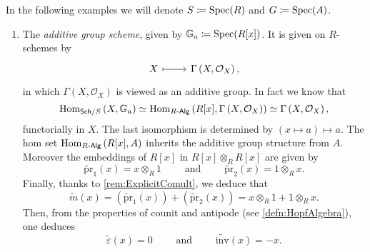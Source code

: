 \begin{ex}\label{ex:AffineGroupSchemesExamples}
	In the following examples we will denote $S \coloneqq \operatorname{Spec}(R)$
	and $G \coloneqq \operatorname{Spec}(A)$.\nopagebreak[4]
	\begin{enumerate}
		\item \label{ex:AdditiveGroupScheme}
		The \emph{additive group scheme}, given by 
			$\mathbb{G}_a \coloneqq \operatorname{Spec}(R[x])$.
			It is given on $R$-schemes by
			\begin{equation*}
			\begin{tikzcd}[row sep = 0ex
				,/tikz/column 1/.append style={anchor=base east}
				,/tikz/column 2/.append style={anchor=base west}]
				X \arrow[r, "", mapsto] & 
				\Gamma \left( X , \mathcal{O}_{ X } \right)
			,\end{tikzcd}
			\end{equation*} 
			in which $\Gamma \left( X , \mathcal{O}_{ X } \right)$ is viewed
			as an additive group.
			In fact	we know that
			\begin{equation*}
			\operatorname{Hom}_{\mathsf{Sch}/S} \left( X, \mathbb{G}_a \right) \simeq
			\operatorname{Hom}_{R \text{-}\mathsf{Alg}} 
			\left( R[x], \Gamma \left( X , \mathcal{O}_{ X } \right) \right) \simeq
			\Gamma \left( X , \mathcal{O}_{ X } \right)
			,\end{equation*} 
			functorially in $X$.
			The last isomorphism is determined by 
			$(x \mapsto a) \mapsto a$.
			The hom set 
			$\operatorname{Hom}_{R \text{-}\mathsf{Alg}} \left( R[x], A \right)$
			inherits the additive group structure from $A$.
			Moreover the embeddings
			of $R[x]$ in $R[x] \otimes_R R[x]$ are given by
			\begin{equation*}
				\widetilde{\mathrm{pr}}_1(x) = x \otimes_R 1
				\qquad \text{ and } \qquad
				\widetilde{\mathrm{pr}}_2(x) = 1 \otimes_R x
			.\end{equation*} 
			Finally, thanks to \cref{rem:ExplicitComult},
			we deduce that
			\begin{equation*}
				\widetilde{m}(x) =
				\left( \widetilde{\mathrm{pr}}_1(x) \right) +
				\left( \widetilde{\mathrm{pr}}_2(x) \right) =
				x \otimes_R 1 + 1 \otimes_R x
			.\end{equation*} 
			Then, from the properties of counit and antipode
			(see \cref{defn:HopfAlgebra}), one deduces 
			\begin{equation*}
				\widetilde{\varepsilon}(x) = 0
				\qquad \text{ and } \qquad
				\widetilde{\mathrm{inv}}(x) = -x
			.\end{equation*} 



\end{enumerate}
\end{ex}
